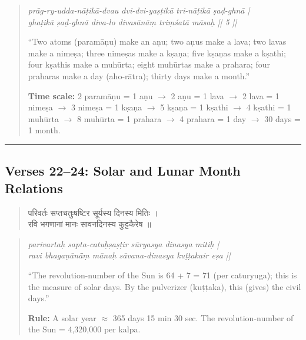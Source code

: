 \documentclass[11pt,a4paper]{article}
\newcommand{\dev}[1]{{\devanagarifont #1}}
\theoremstyle{definition}
\begin{document}
\hfill\noindent
\begin{quote}
\textit{pr\=ag-ry-udda-n\=a\d{t}ik\=a-dvau dvi-dvi-ya\d{s}\d{t}ik\=a tri-n\=a\d{t}ik\=a \d{s}a\d{d}-ghn\=a |\\
gha\d{t}ik\=a \d{s}a\d{d}-ghn\=a diva-lo divas\=an\=a\d{m} tri\d{m}\'sat\=a m\=asa\d{h} || 5 ||}

``Two atoms (param\=a\d{n}u) make an a\d{n}u; two a\d{n}us make a lava; two lavas make a nime\d{s}a; three nime\d{s}as make a k\d{s}a\d{n}a; five k\d{s}a\d{n}as make a k\d{s}athi; four k\d{s}athis make a muh\=urta; eight muh\=urtas make a prahara; four praharas make a day (aho-r\=atra); thirty days make a month.''

\textbf{Time scale:} 2 param\=a\d{n}u = 1 a\d{n}u $\to$ 2 a\d{n}u = 1 lava $\to$ 2 lava = 1 nime\d{s}a $\to$ 3 nime\d{s}a = 1 k\d{s}a\d{n}a $\to$ 5 k\d{s}a\d{n}a = 1 k\d{s}athi $\to$ 4 k\d{s}athi = 1 muh\=urta $\to$ 8 muh\=urta = 1 prahara $\to$ 4 prahara = 1 day $\to$ 30 days = 1 month.
\end{quote}



\vspace{0.5cm}
\noindent\rule{\textwidth}{0.6pt}
\vspace{0.5cm}

\subsection*{Verses 22--24: Solar and Lunar Month Relations}



\noindent
\begin{quote}
\dev{परिवर्तः सप्तचतुःषष्टिर सूर्यस्य दिनस्य मितिः ।\\
रवि भगणानां मानः सावनदिनस्य कुट्टकैरेष ॥}
\end{quote}

\hfill\noindent
\begin{quote}
\textit{parivarta\d{h} sapta-catu\d{h}\d{s}a\d{s}\d{t}ir s\=uryasya dinasya miti\d{h} |\\
ravi bhaga\d{n}\=an\=\=a\d{m} m\=ana\d{h} s\=avana-dinasya ku\d{t}\d{t}akair e\d{s}a ||}

``The revolution-number of the Sun is 64 + 7 = 71 (per caturyuga); this is the measure of solar days. By the pulverizer (ku\d{t}\d{t}aka), this (gives) the civil days.''

\textbf{Rule:} A solar year $\approx$ 365 days 15 min 30 sec. The revolution-number of the Sun = 4,320,000 per kalpa.
\end{quote}
\end{document}
